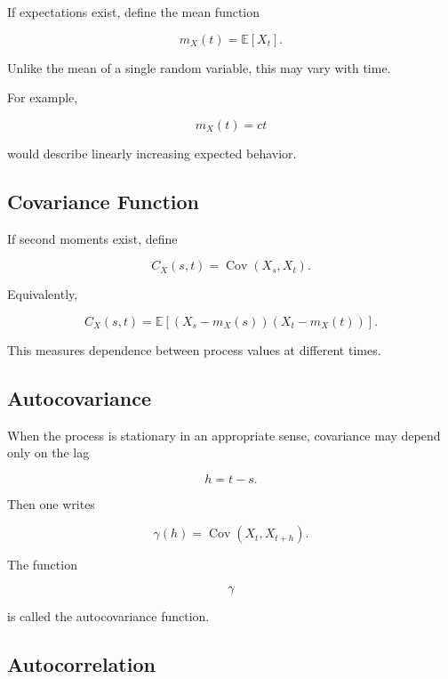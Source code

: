 If expectations exist, define the mean function

\[
\boxed{
m_X(t)
=
\mathbb{E}[X_t].
}
\]

Unlike the mean of a single random variable, this may vary with time.

For example,

\[
m_X(t)=ct
\]

would describe linearly increasing expected behavior.

\subsection{Covariance Function}
\label{subsec:process-covariance-function}

If second moments exist, define

\[
\boxed{
C_X(s,t)
=
\operatorname{Cov}(X_s,X_t).
}
\]

Equivalently,

\[
\boxed{
C_X(s,t)
=
\mathbb{E}
[
(X_s-m_X(s))
(X_t-m_X(t))
].
}
\]

This measures dependence between process values at different times.

\subsection{Autocovariance}
\label{subsec:autocovariance}

When the process is stationary in an appropriate sense, covariance may
depend only on the lag

\[
h=t-s.
\]

Then one writes

\[
\boxed{
\gamma(h)
=
\operatorname{Cov}(X_t,X_{t+h}).
}
\]

The function

\[
\gamma
\]

is called the autocovariance function.

\subsection{Autocorrelation}
\label{subsec:autocorrelation}

